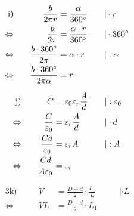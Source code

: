 \begin{exercise}
    \begin{minipage}[t]{0.47\linewidth}
      \makeatletter\@fleqntrue\makeatother
      \begin{alignat*}{3}
        \text{i)}&\quad
        &
        \frac{b}{2\pi r}&=\frac{\alpha}{360^{\circ}}
        &
        \quad&|\cdot r
        \\
        \Leftrightarrow&\quad
        &
        \frac{b}{2\pi}&=\frac{\alpha\cdot r}{360^{\circ}}
        &
        \quad&|\cdot360^\circ
        \\
        \Leftrightarrow&\quad
        &
        \frac{b\cdot360^\circ}{2\pi}&=\alpha\cdot r
        &
        \quad&|:\alpha
        \\
        \Leftrightarrow&\quad
        &
        \frac{b\cdot360^\circ}{2\pi\alpha}&=r
        &
        \quad&\relax
      \end{alignat*}
    \end{minipage}\hfill
    \begin{minipage}[t]{0.51\linewidth}
      \makeatletter\@fleqntrue\makeatother
      \begin{alignat*}{3}
        \text{j)}&\quad
        &
        C&=\varepsilon_{0}\varepsilon_{r}\frac{A}{d}
        &
        \quad&|:\varepsilon_{0}
        \\
        \Leftrightarrow&\quad
        &
        \frac{C}{\varepsilon_{0}}&=\varepsilon_{r}\frac{A}{d}
        &
        \quad&|\cdot d
        \\
        \Leftrightarrow&\quad
        &
        \frac{Cd}{\varepsilon_{0}}&=\varepsilon_{r}A
        &
        \quad&|:A
        \\
        \Leftrightarrow&\quad
        &
        \frac{Cd}{A\varepsilon_{0}}&=\varepsilon_{r}
        &
        \quad&\relax
      \end{alignat*}
    \end{minipage}
    \begin{minipage}[t]{0.47\linewidth}
      \makeatletter\@fleqntrue\makeatother
      \begin{alignat*}{3}
        \text{k)}&\quad
        &
        V&=\frac{D-d}{2}\cdot\frac{L_{1}}{L}
        &
        \quad&|\cdot L
        \\
        \Leftrightarrow&\quad
        &
        VL&=\frac{D-d}{2}\cdot L_{1}

\end{alignat*}
\end{minipage}
\end{exercise}
